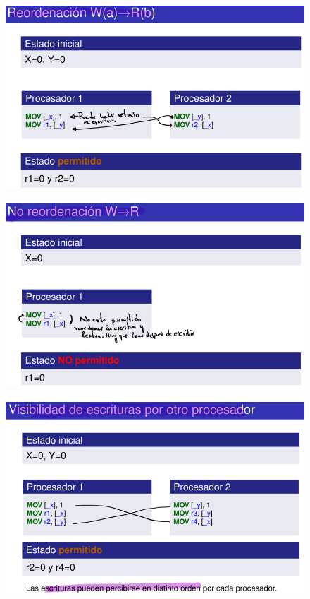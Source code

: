 \documentclass[12pt, twoside, openright]{report} %
\begin{document}
    \begin{figure}[H]
      {\includegraphics[scale=.5]{Untitled 64.png}}
    \end{figure}
    \begin{figure}[H]
      {\includegraphics[scale=.5]{Untitled 65.png}}
    \end{figure}
    \begin{figure}[H]
      {\includegraphics[scale=.5]{Untitled 66.png}}
    \end{figure}
\end{document}
